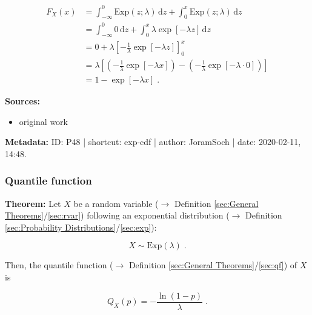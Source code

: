 \documentclass[a4paper,12pt,twoside]{book}
\begin{document}
\begin{equation} \label{eq:exp-cdf-exp-cdf-s2b}
\begin{split}
F_X(x) &= \int_{-\infty}^{0} \mathrm{Exp}(z; \lambda) \, \mathrm{d}z + \int_{0}^{x} \mathrm{Exp}(z; \lambda) \, \mathrm{d}z \\
&= \int_{-\infty}^{0} 0 \, \mathrm{d}z + \int_{0}^{x} \lambda \exp[-\lambda z] \, \mathrm{d}z \\
&= 0 + \lambda \left[ -\frac{1}{\lambda} \exp[-\lambda z] \right]_{0}^{x} \\
&= \lambda \left[ \left( -\frac{1}{\lambda} \exp[-\lambda x] \right) - \left( -\frac{1}{\lambda} \exp[-\lambda \cdot 0] \right) \right] \\
&= 1 - \exp[-\lambda x] \; .
\end{split}
\end{equation}


\vspace{1em}
\textbf{Sources:}
\begin{itemize}
\item original work\end{itemize}


\vspace{1em}
\textbf{Metadata:} ID: P48 | shortcut: exp-cdf | author: JoramSoch | date: 2020-02-11, 14:48.
\vspace{1em}



\subsubsection[\textbf{Quantile function}]{Quantile function} \label{sec:exp-qf}
\setcounter{equation}{0}

\textbf{Theorem:} Let $X$ be a random variable ($\rightarrow$ Definition \ref{sec:General Theorems}/\ref{sec:rvar}) following an exponential distribution ($\rightarrow$ Definition \ref{sec:Probability Distributions}/\ref{sec:exp}):

\begin{equation} \label{eq:exp-qf-exp}
X \sim \mathrm{Exp}(\lambda) \; .
\end{equation}

Then, the quantile function ($\rightarrow$ Definition \ref{sec:General Theorems}/\ref{sec:qf}) of $X$ is

\begin{equation} \label{eq:exp-qf-exp-qf}
Q_X(p) = -\frac{\ln(1-p)}{\lambda} \; .
\end{equation}
\end{document}
